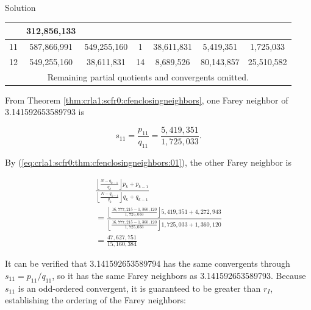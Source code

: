 \begin{vworkexampleparsection}{Solution}
\begin{table}
\begin{center}
\begin{tabular}{|c|c|c|c|c|c|c|}
              & \small{312,856,133}       &                            &                 &                         &                    &                     \\
\hline
\small{11}    & \small{587,866,991}       & \small{549,255,160}        & \small{1}       & \small{38,611,831}      & \small{5,419,351}  & \small{1,725,033}   \\
\hline
\small{12}    & \small{549,255,160}       & \small{38,611,831}         & \small{14}      & \small{8,689,526}       & \small{80,143,857} & \small{25,510,582}  \\
\hline
\multicolumn{7}{|c|}{\small{Remaining partial quotients and convergents omitted.}} \\
\hline
\end{tabular}
\end{center}
\end{table}

From Theorem \ref{thm:crla1:scfr0:cfenclosingneighbors}, one Farey
neighbor of 3.141592653589793 is

\begin{equation}
s_{11} = \frac{p_{11}}{q_{11}} = \frac{5,\!419,\!351}{1,\!725,\!033} .
\end{equation}

By (\ref{eq:crla1:scfr0:thm:cfenclosingneighbors:01}), the other Farey neighbor is

\begin{eqnarray}
\nonumber{}& \displaystyle{\frac{{\displaystyle{\left\lfloor {\frac{{N - q_{k - 1} }}{{q_k }}} \right\rfloor}
 p_k  + p_{k - 1} }}{{\displaystyle{\left\lfloor {\frac{{N - q_{k - 1} }}{{q_k }}}
 \right\rfloor} q_k  + q_{k - 1} }}}
& \\
& =
\displaystyle{\frac{{\displaystyle{\left\lfloor {\frac{{16,\!777,\!215 - 1,\!360,\!120 }}{{1,\!725,\!033}}} \right\rfloor}
 5,\!419,\!351  + 4,\!272,\!943 }}{{\displaystyle{\left\lfloor {\frac{{16,\!777,\!215 - 1,\!360,\!120 }}{{1,\!725,\!033}}}
 \right\rfloor} 1,\!725,\!033  + 1,\!360,\!120 }}} & \\
\nonumber{}& =
\displaystyle{\frac{\displaystyle{47,\!627,\!751}}{\displaystyle{15,\!160,\!384}}} &
\end{eqnarray}

It can be verified that 3.141592653589794 has the same convergents through
$s_{11} = p_{11}/q_{11}$, so it has the same Farey neighbors as
3.141592653589793\@.  Because $s_{11}$ is an odd-ordered convergent, it is guaranteed to
be greater than $r_I$, establishing the ordering of the Farey neighbors:


\end{vworkexampleparsection}

